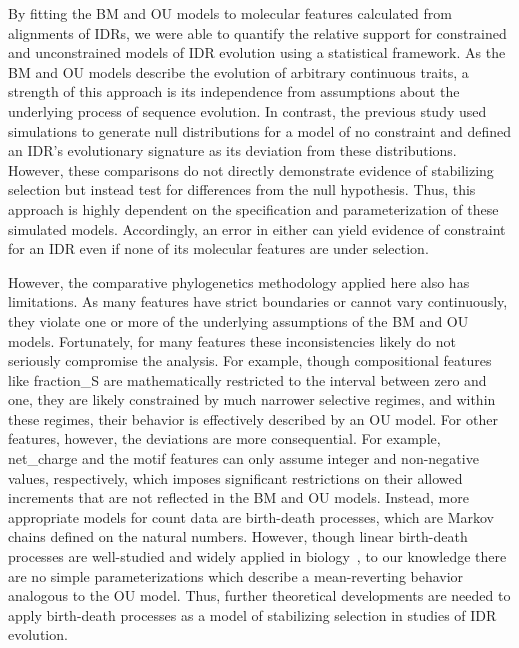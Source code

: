 
By fitting the BM and OU models to molecular features calculated from alignments of IDRs, we were able to quantify the relative support for constrained and unconstrained models of IDR evolution using a statistical framework. As the BM and OU models describe the evolution of arbitrary continuous traits, a strength of this approach is its independence from assumptions about the underlying process of sequence evolution. In contrast, the previous study used simulations to generate null distributions for a model of no constraint and defined an IDR's evolutionary signature as its deviation from these distributions. However, these comparisons do not directly demonstrate evidence of stabilizing selection but instead test for differences from the null hypothesis. Thus, this approach is highly dependent on the specification and parameterization of these simulated models. Accordingly, an error in either can yield evidence of constraint for an IDR even if none of its molecular features are under selection.

However, the comparative phylogenetics methodology applied here also has limitations. As many features have strict boundaries or cannot vary continuously, they violate one or more of the underlying assumptions of the BM and OU models. Fortunately, for many features these inconsistencies likely do not seriously compromise the analysis. For example, though compositional features like fraction\_S are mathematically restricted to the interval between zero and one, they are likely constrained by much narrower selective regimes, and within these regimes, their behavior is effectively described by an OU model. For other features, however, the deviations are more consequential. For example, net\_charge and the motif features can only assume integer and non-negative values, respectively, which imposes significant restrictions on their allowed increments that are not reflected in the BM and OU models. Instead, more appropriate models for count data are birth-death processes, which are Markov chains defined on the natural numbers. However, though linear birth-death processes are well-studied and widely applied in biology~\cite{Crawford2011}, to our knowledge there are no simple parameterizations which describe a mean-reverting behavior analogous to the OU model. Thus, further theoretical developments are needed to apply birth-death processes as a model of stabilizing selection in studies of IDR evolution.

